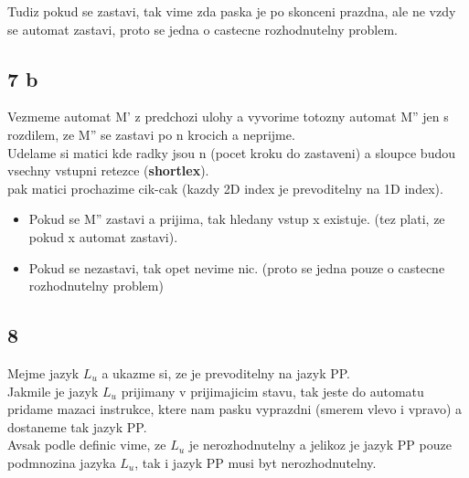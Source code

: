 \documentclass[a4paper]{article}
\begin{document}
Tudiz pokud se zastavi, tak vime zda paska je po skonceni prazdna, ale
ne vzdy se automat zastavi, proto se jedna o castecne rozhodnutelny problem.


\subsection*{7 b}

Vezmeme automat M' z predchozi ulohy a vyvorime totozny automat M'' jen s rozdilem, ze M'' se zastavi po n krocich a neprijme.\\
Udelame si matici kde radky jsou n (pocet kroku do zastaveni) a
sloupce budou vsechny vstupni retezce (\textbf{shortlex}).\\
pak matici prochazime cik-cak (kazdy 2D index je prevoditelny na 1D index).\\
\begin{itemize}
    \item Pokud se M'' zastavi a prijima, tak hledany vstup x existuje. (tez plati, ze pokud x automat zastavi).\\
    \item Pokud se nezastavi, tak opet nevime nic. (proto se jedna pouze o castecne rozhodnutelny problem) 
\end{itemize}


\subsection*{8}

Mejme jazyk $L_u$ a ukazme si, ze je prevoditelny na jazyk PP.\\
Jakmile je jazyk $L_u$ prijimany v prijimajicim stavu, tak jeste do automatu pridame mazaci instrukce,
ktere nam pasku vyprazdni (smerem vlevo i vpravo) a dostaneme tak jazyk PP.\\
Avsak podle definic vime, ze $L_u$ je nerozhodnutelny a jelikoz je jazyk PP pouze podmnozina jazyka $L_u$, tak i jazyk PP musi byt nerozhodnutelny.
\end{document}
